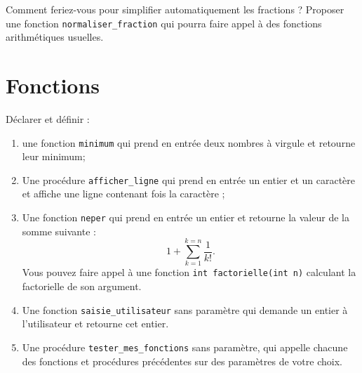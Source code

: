 \question Comment feriez-vous pour simplifier automatiquement les
fractions ? Proposer une fonction \verb|normaliser_fraction| qui
pourra faire appel à des fonctions arithmétiques usuelles. 
\section{Fonctions}
\question Déclarer et définir :
\begin{enumerate}
\item une fonction \verb|minimum| qui prend en entrée deux nombres à virgule
  et retourne leur minimum;
\item Une procédure \verb|afficher_ligne| qui prend en entrée un
  entier  et un caractère  et affiche une ligne contenant
   fois la caractère ;
\item Une fonction \verb|neper| qui prend en entrée un entier  et
  retourne la valeur de la somme suivante :
\[
1 + \sum^{k = n}_{k = 1} \frac{1}{k!}.
\]
Vous pouvez faire appel à une
  fonction \verb|int factorielle(int n)| calculant la factorielle de
  son argument.
\item Une fonction \verb|saisie_utilisateur| sans paramètre qui
  demande un entier à l'utilisateur et retourne cet entier.
\item Une procédure \verb|tester_mes_fonctions| sans paramètre, qui
  appelle chacune des fonctions et procédures précédentes sur des
  paramètres de votre choix.
\end{enumerate}


